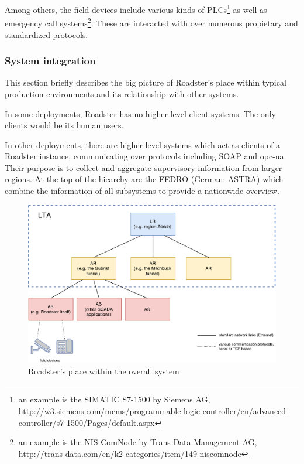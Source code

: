 Among others, the field devices include various kinds of \glspl{PLC}\footnote{an example
is the SIMATIC S7-1500 by Siemens AG,
\url{http://w3.siemens.com/mcms/programmable-logic-controller/en/advanced-controller/s7-1500/Pages/default.aspx}}
as well as emergency call systems\footnote{an example is the NIS ComNode by Trans Data
Management AG,
\url{http://trans-data.com/en/k2-categories/item/149-niscomnode}}.
These are interacted with over numerous propietary and standardized protocols.

\subsubsection{System integration}
This section briefly describes the big picture of Roadster's place within
typical production environments and its relationship with other systems.

In some deployments, Roadster has no higher-level client systems. The only
clients would be its human users. %

In other deployments, there are higher level systems which act as clients of a Roadster instance, communicating over
protocols including \gls{SOAP} and \gls{opc-ua}. Their purpose is to
collect and aggregate supervisory information from larger regions. At the top of the
hiearchy are the \gls{FEDRO} (German: \gls{ASTRA}) which combine the information of all
subsystems to provide a nationwide overview.

\begin{figure}[]
	\includegraphics[width=\textwidth]{img/overall_system.pdf}
	\caption{Roadster's place within the overall system}
	\label{fig:roadster:overallsys}
\end{figure}

